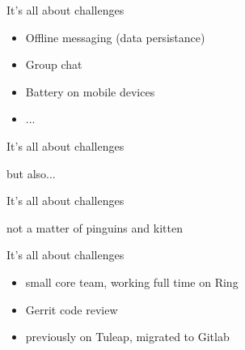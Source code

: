 \documentclass[pdf]{beamer}
\begin{document}

\begin{frame}{It's all about challenges}

\begin{itemize}
\item Offline messaging (data persistance)
\item Group chat
\item Battery on mobile devices
\item ...
\end{itemize}

\end{frame}


\begin{frame}{It's all about challenges}

but also...


\end{frame}


\begin{frame}{It's all about challenges}

not a matter of pinguins and kitten

\end{frame}


\begin{frame}{It's all about challenges}

\begin{itemize}
\item small core team, working full time on Ring
\item Gerrit code review
\item previously on Tuleap, migrated to Gitlab
\end{itemize}

\end{frame}

\end{document}
